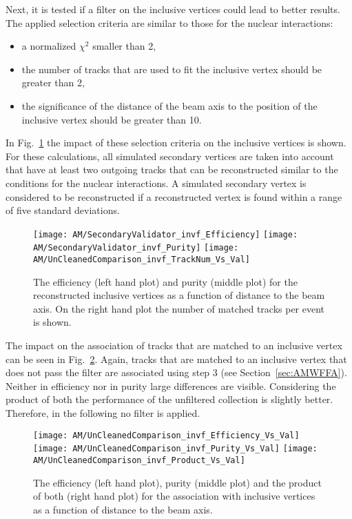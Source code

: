Next, it is tested if a filter on the inclusive vertices could lead to better results. The applied selection criteria are similar to those for the nuclear interactions:
\begin{itemize}
    \item a normalized $\chi^{2}$ smaller than 2,
    \item the number of tracks that are used to fit the inclusive vertex should be greater than 2,
    \item the significance of the distance of the beam axis to the position of the inclusive vertex should be greater than 10.
\end{itemize}

In Fig.~\ref{plot:AMWFSVinvfEffAndPurDC} the impact of these selection criteria on the inclusive vertices is shown. For these calculations, all simulated secondary vertices are taken into account that have at least two outgoing tracks that can be reconstructed similar to the conditions for the nuclear interactions. A simulated secondary vertex is considered to be reconstructed if a reconstructed vertex is found within a range of five standard deviations.

\begin{figure}[!ht]
    \centering
    \texttt{[image: AM/SecondaryValidator\_invf\_Efficiency]}
    \texttt{[image: AM/SecondaryValidator\_invf\_Purity]}
    \texttt{[image: AM/UnCleanedComparison\_invf\_TrackNum\_Vs\_Val]}
    \caption[Purity and efficiency of the reconstructed inclusive vertices as a function of distance to the beam axis and number of matched tracks]{The efficiency (left hand plot) and purity (middle plot) for the reconstructed inclusive vertices as a function of distance to the beam axis. On the right hand plot the number of matched tracks per event is shown. \label{plot:AMWFSVinvfEffAndPurDC}}
\end{figure}

The impact on the association of tracks that are matched to an inclusive vertex can be seen in Fig.~\ref{plot:AMWFSVinvfEffAndPurRT}.  Again, tracks that are matched to an inclusive vertex that does not pass the filter are associated using step 3 (see Section~\ref{sec:AMWFFA}). Neither in efficiency nor in purity large differences are visible. Considering the product of both the performance of the unfiltered collection is slightly better. Therefore, in the following no filter is applied.

\begin{figure}[!ht]
    \centering
    \texttt{[image: AM/UnCleanedComparison\_invf\_Efficiency\_Vs\_Val]}
    \texttt{[image: AM/UnCleanedComparison\_invf\_Purity\_Vs\_Val]}
    \texttt{[image: AM/UnCleanedComparison\_invf\_Product\_Vs\_Val]}
    \caption[Efficiency, purity and their product for the association with inclusive vertices a function of distance to the beam axis]{The efficiency (left hand plot), purity (middle plot) and the product of both (right hand plot) for the association with inclusive vertices as a function of distance to the beam axis. \label{plot:AMWFSVinvfEffAndPurRT}}
\end{figure}

